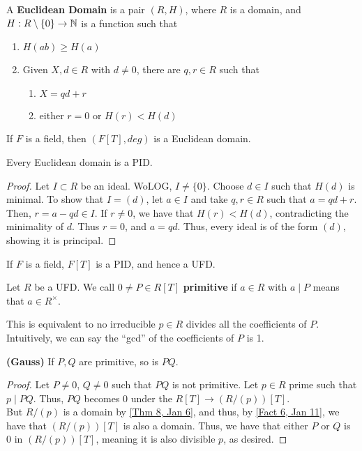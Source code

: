 \begin{defn} \label{Defn 4, Jan 20}
    A \textbf{Euclidean Domain} is a pair $(R, H)$, where $R$ is a domain, and
    $H: R \setminus \{0\} \rightarrow \mathbb{N}$ is a function such that
    \begin{enumerate}
        \item $H(ab) \geq H(a)$
        \item Given $X,d \in R$ with $d \neq 0$, there are $q, r \in R$ such that
        \begin{enumerate}
            \item $X = qd + r$
            \item either $r = 0$ or $H(r) < H(d)$
        \end{enumerate}
    \end{enumerate}
\end{defn}
\begin{ex}
    If $F$ is a field, then $(F[T], deg)$ is a Euclidean domain.
\end{ex}
\begin{prop} \label{Prop 5, Jan 20}
    Every Euclidean domain is a PID.
\end{prop}
\begin{proof}
    Let $I \subset R$ be an ideal. WoLOG, $I \neq \{0\}$. Choose $d \in I$ such
    that $H(d)$ is minimal. To show that $I = (d)$, let $a \in I$ and take $q,r \in R$
    such that $a = qd + r$. Then, $r = a - qd \in I$. If $r \neq 0$, we have that $H(r) < H(d)$,
    contradicting the minimality of $d$. Thus $r = 0$, and $a = qd$. Thus,
    every ideal is of the form $(d)$, showing it is principal.
\end{proof}
\begin{cor} \label{Cor 6, Jan 20}
    If $F$ is a field, $F[T]$ is a PID, and hence a UFD.
\end{cor}
\begin{defn} \label{Defn 7, Jan 20}
    Let $R$ be a UFD. We call $0 \neq P \in R[T]$ \textbf{primitive} if $a \in R$
    with $a \mid P$ means that $a \in R^\times$.
\end{defn}
\begin{rmk}
    This is equivalent to no irreducible $p \in R$ divides all the coefficients of
    $P$. Intuitively, we can say the ``gcd'' of the coefficients of $P$ is 1.
\end{rmk}
\begin{lemma} \label{Lemma 8, Jan 20}
    \textbf{(Gauss)} If $P,Q$ are primitive, so is $PQ$.
\end{lemma}
\begin{proof}
    Let $P \neq 0$, $Q \neq 0$ such that $PQ$ is not primitive. Let $p \in R$ prime
    such that $p \mid PQ$. Thus, $PQ$ becomes $0$ under the
    $R[T] \rightarrow (R/(p))[T]$. \\
    But $R / (p)$ is a domain by \ref{Thm 8, Jan 6}, and thus, by \ref{Fact 6, Jan 11}, we have
    that $(R/(p))[T]$ is also a domain. Thus, we have that either $P$ or $Q$ is
    0 in $(R / (p))[T]$, meaning it is also divisible $p$, as desired.
\end{proof}
